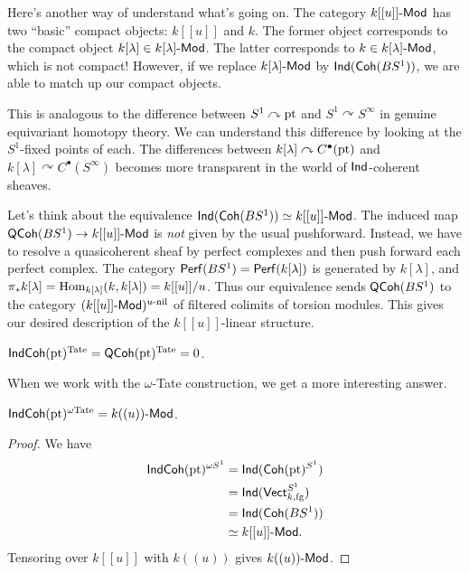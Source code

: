 \documentclass{article}
\begin{document}
\begin{rmk}
  Here's another way of understand what's going on.
  The category $k[[u]]\text{-}\mathsf{Mod}$ has two ``basic'' compact objects: $k[[u]]$ and $k$.
  The former object corresponds to the compact object $k[\lambda] \in k[\lambda]\text{-}\mathsf{Mod}$.
  The latter corresponds to $k \in k[\lambda]\text{-}\mathsf{Mod}$, which is not compact!
  However, if we replace $k[\lambda]\text{-}\mathsf{Mod}$ by $\operatorname{\mathsf{Ind}}(\mathsf{Coh}(BS^1))$, we are able to match up our compact objects.

  This is analogous to the difference between $S^1 \curvearrowright \operatorname{pt}$ and $S^1 \curvearrowright S^\infty$ in genuine equivariant homotopy theory.
  We can understand this difference by looking at the $S^1$-fixed points of each.
  The differences between $k[\lambda] \curvearrowright C^\bullet(\operatorname{pt})$ and $k[\lambda] \curvearrowright C^\bullet(S^\infty)$ becomes more transparent in the world of $\operatorname{\mathsf{Ind}}$-coherent sheaves.
\end{rmk}

Let's think about the equivalence $\operatorname{\mathsf{Ind}}(\mathsf{Coh}(BS^1)) \simeq k[[u]]\text{-}\mathsf{Mod}$.
The induced map $\mathsf{QCoh}(BS^1) \to k[[u]]\text{-}\mathsf{Mod}$ is \emph{not} given by the usual pushforward.
Instead, we have to resolve a quasicoherent sheaf by perfect complexes and then push forward each perfect complex.
The category $\mathsf{Perf}(BS^1) = \mathsf{Perf}(k[\lambda])$ is generated by $k[\lambda]$, and $\pi_* k[\lambda] = \operatorname{Hom}_{k[\lambda]}(k, k[\lambda]) = k[[u]] / u$.
Thus our equivalence sends $\mathsf{QCoh}(BS^1)$ to the category $(k[[u]]\text{-}\mathsf{Mod})^{u\textrm{-nil}}$ of filtered colimits of torsion modules.
This gives our desired description of the $k[[u]]$-linear structure.

\begin{cor}
  $\mathsf{IndCoh}(\operatorname{pt})^{\mathrm{Tate}} = \mathsf{QCoh}(\operatorname{pt})^{\mathrm{Tate}} = 0$.
\end{cor}

When we work with the $\omega$-Tate construction, we get a more interesting answer.

\begin{cor}
  $\mathsf{IndCoh}(\operatorname{pt})^{\omega\mathrm{Tate}} = k((u))\text{-}\mathsf{Mod}$.
\end{cor}

\begin{proof}
  We have 
  \begin{align*}
    \mathsf{IndCoh}(\operatorname{pt})^{\omega S^1} &= \operatorname{\mathsf{Ind}}(\mathsf{Coh}(\operatorname{pt})^{S^1}) \\
                              &= \operatorname{\mathsf{Ind}}(\mathsf{Vect}_{k,\textrm{fg}}^{S^1}) \\
                              &= \operatorname{\mathsf{Ind}}(\mathsf{Coh}(BS^1)) \\
                              &\simeq k[[u]]\text{-}\mathsf{Mod}.
  \end{align*}
  Tensoring over $k[[u]]$ with $k((u))$ gives $k((u))\text{-}\mathsf{Mod}$.
\end{proof}
\end{document}

